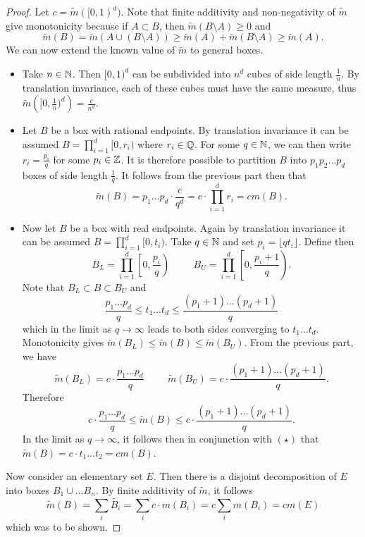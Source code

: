\documentclass[hw_all.tex]{subfiles}
\begin{document}
\begin{proof}
    Let $c = \tilde{m}([0,1)^d)$. Note that finite additivity and non-negativity of $\tilde{m}$ give monotonicity because if $A \subset B$, then $\tilde{m}(B \setminus A) \geq 0$ and 
    \[
        \tilde{m}(B) = \tilde{m}(A \cup (B \setminus A)) \geq \tilde{m}(A) + \tilde{m}(B \setminus A) \geq \tilde{m}(A)
    .\]
    We can now extend the known value of $\tilde{m}$ to general boxes.
    \begin{itemize}
        \item Take $n \in \mathbb{N}$. Then $[0,1)^d$ can be subdivided into $n^d$ cubes of side length $\frac{1}{n}$. By translation invariance, each of these cubes must have the same measure, thus $\tilde{m} \left([0, \frac{1}{n})^d\right) = \frac{c}{n^d}$. 
        \item Let $B$ be a box with rational endpoints. By translation invariance it can be assumed $B = \prod_{i=1}^d [0, r_i)$ where $r_i \in \mathbb{Q}$. For some $q \in \mathbb{N}$, we can then write $r_i = \frac{p_i}{q}$ for some $p_i \in \mathbb{Z}$. It is therefore possible to partition $B$ into $p_1 p_2 \ldots p_d$ boxes of side length $\frac{1}{q}$. It follows from the previous part then that 
            \[
            \tilde{m}(B) = p_1 \ldots p_d \cdot \frac{c}{q^d} = c \cdot \prod_{i=1}^d r_i = c m(B)
            .\]
        \item Now let $B$ be a box with real endpoints. Again by translation invariance it can be assumed $B = \prod_{i=1}^d [0, t_i)$. Take $q \in \mathbb{N}$ and set $p_i = \lfloor qt_i \rfloor$. Define then
            \[
                B_L = \prod_{i=1}^d \left[0, \frac{p_i}{q}\right) \hspace{1cm} B_U = \prod_{i=1}^d \left[0, \frac{p_i + 1}{q}\right)
            .\]
            Note that $B_L \subset B \subset B_U$ and 
            \[
                \frac{p_1 \ldots p_d}{q} \leq t_1 \ldots t_d \leq \frac{(p_1 + 1)\ldots(p_d + 1)}{q} \tag{\star}
            \]
            which in the limit as $q \to \infty$ leads to both sides converging to $t_1 \ldots t_d$. Monotonicity gives $\tilde{m}(B_L) \leq \tilde{m}(B) \leq \tilde{m}(B_U)$. From the previous part, we have
            \[
                \tilde{m}(B_L) = c \cdot \frac{p_1 \ldots p_d}{q} \hspace{1cm} \tilde{m}(B_U) = c \cdot \frac{(p_1 + 1) \ldots (p_d + 1)}{q}
            .\]
            Therefore
            \[
                c \cdot \frac{p_1 \ldots p_d}{q} \leq \tilde{m}(B) \leq c \cdot \frac{(p_1 + 1) \ldots (p_d + 1)}{q}
            .\]
            In the limit as $q \to \infty$, it follows then in conjunction with $(\star)$ that $\tilde{m}(B) = c \cdot t_1 \ldots t_2 = c m(B)$.
    \end{itemize}
    Now consider an elementary set $E$. Then there is a disjoint decomposition of $E$ into boxes $B_1 \cup \ldots B_n$. By finite additivity of $\tilde{m}$, it follows
    \[
        \tilde{m}(B) = \sum_{i} \tilde{B_i} = \sum_{i} c \cdot m(B_i) = c \sum_{i} m(B_i) = c m(E)
    \]
    which was to be shown.
\end{proof}
\end{document}
